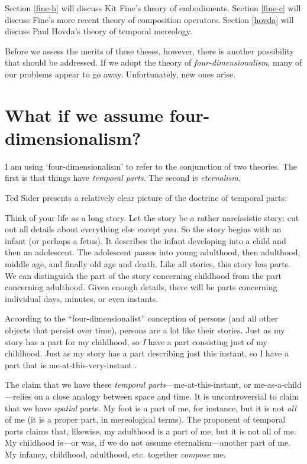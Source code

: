 \documentclass[11pt]{article}
\newenvironment{squote}{%
\begin{spacing}{1}
\begin{list}{}{%
\setlength{\labelwidth}{0pt}%
\rightmargin\leftmargin%
}
\item\relax
}{%
\end{list}%
\end{spacing}
}
\begin{document}
\begin{spacing}{1.5}
Section \ref{fine-h} will discuss Kit Fine's theory of embodiments.
Section \ref{fine-c} will discuss Fine's more recent theory of
composition operators.  Section \ref{hovda} will discuss Paul Hovda's
theory of temporal mereology.

Before we assess the merits of these theses, however, there is another
possibility that should be addressed.  If we adopt the theory of {\em
  four-dimensionalism}, many of our problems appear to go away.
Unfortunately, new ones arise.

\section{What if we assume four-dimensionalism?}
\label{4d}
I am using `four-dimensionalism' to refer to the conjunction of two
theories.  The first is that things have {\em temporal parts}.  The
second is {\em eternalism}.

Ted Sider presents a relatively clear picture of the doctrine of
temporal parts:

\begin{squote}
Think of your life as a long story.  Let the story be a rather
narcissistic story: cut out all details about everything else except
you.  So the story begins with an infant (or perhaps a fetus).  It
describes the infant developing into a child and then an adolescent.
The adolescent passes into young adulthood, then adulthood, middle
age, and finally old age and death.  Like all stories, this story has
parts.  We can distinguish the part of the story concerning childhood
from the part concerning adulthood.  Given enough details, there will
be parts concerning individual days, minutes, or even instants.

According to the ``four-dimensionalist'' conception of persons (and
all other objects that persist over time), persons are a lot like
their stories.  Just as my story has a part for my childhood, so {\em
  I} have a part consisting just of my childhood.  Just as my story
has a part describing just this instant, so I have a part that is
me-at-this-very-instant \citeyearpar[1]{sider2001}.
\end{squote}

The claim that we have these {\em temporal
  parts}---me-at-this-instant, or me-as-a-child---relies on a close
analogy between space and time.  It is uncontroversial to claim that
we have {\em spatial} parts.  My foot is a part of me, for instance,
but it is not {\em all} of me (it is a proper part, in mereological
terms).  The proponent of temporal parts claims that, likewise, my
adulthood is a part of me, but it is not all of me.  My childhood
is---or was, if we do not assume eternalism---another part of me.  My
infancy, childhood, adulthood, etc. together {\em compose} me.


\end{spacing}
\end{document}
